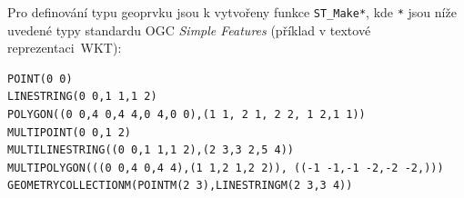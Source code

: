 \documentclass[a4paper,12pt,oneside]{report}
\begin{document}
Pro definování typu geoprvku jsou k vytvořeny funkce
\texttt{ST\_Make*}, kde \texttt{*} jsou níže uvedené typy standardu
OGC \textit{Simple Features} (příklad v textové reprezentaci~\acs{WKT}):


\begin{verbatim}
POINT(0 0)                                               
LINESTRING(0 0,1 1,1 2)                                       
POLYGON((0 0,4 0,4 4,0 4,0 0),(1 1, 2 1, 2 2, 1 2,1 1))          
MULTIPOINT(0 0,1 2)                                              
MULTILINESTRING((0 0,1 1,1 2),(2 3,3 2,5 4))                       
MULTIPOLYGON(((0 0,4 0,4 4),(1 1,2 1,2 2)), ((-1 -1,-1 -2,-2 -2,))) 
GEOMETRYCOLLECTIONM(POINTM(2 3),LINESTRINGM(2 3,3 4))                
\end{verbatim}

\end{document}
